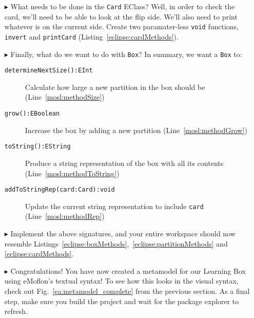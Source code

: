 \begin{itemize}
\vspace{0.5cm}

\item[$\blacktriangleright$] What needs to be done in the \texttt{Card} EClass? Well, in order to check the card, we'll need to be able to look at the flip
side. We'll also need to print whatever is on the current side. Create two paramater-less \texttt{void} functions, \texttt{invert} and \texttt{printCard} (Listing~\ref{eclipse:cardMethods}). 

 

\item[$\blacktriangleright$] Finally, what do we want to do with \texttt{Box}? In summary, we want a \texttt{Box} to:

\begin{description}
  \item[\texttt{determineNextSize():EInt}] Calculate how large a new partition in the box should be (Line~\ref{mosl:methodSize})
  \item[\texttt{grow():EBoolean}] Increase the box by adding a new partition (Line~\ref{mosl:methodGrow})
  \item[\texttt{toString():EString}] Produce a string representation of the box with all its contents (Line~\ref{mosl:methodToString})
  \item[\texttt{addToStringRep(card:Card):void}] Update the current string representation to include \texttt{card} (Line~\ref{mosl:methodRep})
\end{description}

 

\item[$\blacktriangleright$] Implement the above signatures, and your entire workspace should now resemble Listings~\ref{eclipse:boxMethods},~\ref{eclipse:partitionMethods} and~ \ref{eclipse:cardMethods}.

\item[$\blacktriangleright$] Congratulations! You have now created a metamodel for our Learning Box using eMoflon's textual syntax! To see how
this looks in the visual syntax, check out Fig.~\ref{ea:metamodel_complete} from the previous section. As a final step, make sure you build the project and
wait for the package explorer to refresh. 






\end{itemize}